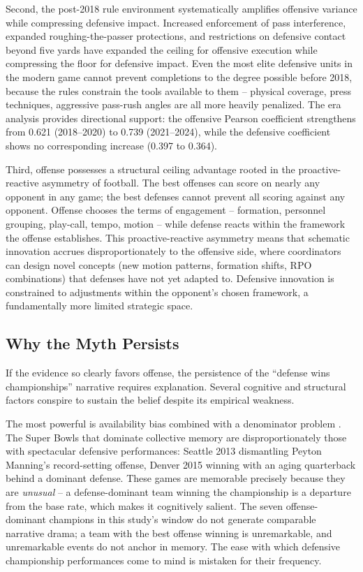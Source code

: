 \documentclass[12pt,a4paper]{article}
\begin{document}
Second, the post-2018 rule environment systematically amplifies offensive variance while compressing defensive impact. Increased enforcement of pass interference, expanded roughing-the-passer protections, and restrictions on defensive contact beyond five yards \citep{pereira2018roughing, barnwell2019passingrevolution} have expanded the ceiling for offensive execution while compressing the floor for defensive impact. Even the most elite defensive units in the modern game cannot prevent completions to the degree possible before 2018, because the rules constrain the tools available to them -- physical coverage, press techniques, aggressive pass-rush angles are all more heavily penalized. The era analysis provides directional support: the offensive Pearson coefficient strengthens from 0.621 (2018--2020) to 0.739 (2021--2024), while the defensive coefficient shows no corresponding increase (0.397 to 0.364).

Third, offense possesses a structural ceiling advantage rooted in the proactive-reactive asymmetry of football. The best offenses can score on nearly any opponent in any game; the best defenses cannot prevent all scoring against any opponent. Offense chooses the terms of engagement -- formation, personnel grouping, play-call, tempo, motion -- while defense reacts within the framework the offense establishes. This proactive-reactive asymmetry means that schematic innovation accrues disproportionately to the offensive side, where coordinators can design novel concepts (new motion patterns, formation shifts, RPO combinations) that defenses have not yet adapted to. Defensive innovation is constrained to adjustments within the opponent's chosen framework, a fundamentally more limited strategic space.

\subsection{Why the Myth Persists}
\label{sec:myth}

If the evidence so clearly favors offense, the persistence of the ``defense wins championships'' narrative requires explanation. Several cognitive and structural factors conspire to sustain the belief despite its empirical weakness.

The most powerful is availability bias combined with a denominator problem \citep{tversky1973availability}. The Super Bowls that dominate collective memory are disproportionately those with spectacular defensive performances: Seattle 2013 dismantling Peyton Manning's record-setting offense, Denver 2015 winning with an aging quarterback behind a dominant defense. These games are memorable precisely because they are \emph{unusual} -- a defense-dominant team winning the championship is a departure from the base rate, which makes it cognitively salient. The seven offense-dominant champions in this study's window do not generate comparable narrative drama; a team with the best offense winning is unremarkable, and unremarkable events do not anchor in memory. The ease with which defensive championship performances come to mind is mistaken for their frequency.
\end{document}
